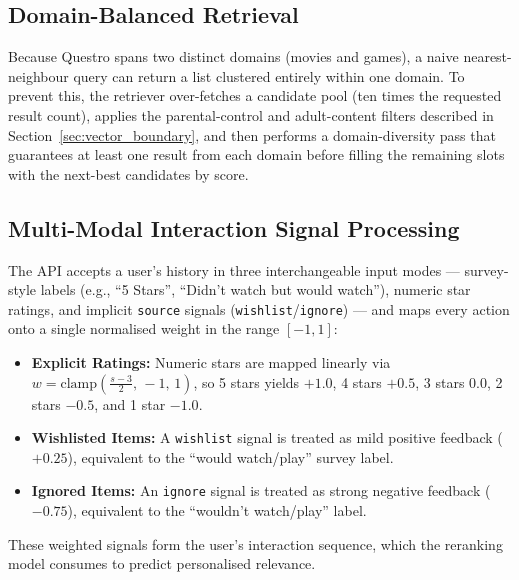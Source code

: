 \subsection{Domain-Balanced Retrieval}
Because Questro spans two distinct domains (movies and games), a naive nearest-neighbour query can return a list clustered entirely within one domain. To prevent this, the retriever over-fetches a candidate pool (ten times the requested result count), applies the parental-control and adult-content filters described in Section~\ref{sec:vector_boundary}, and then performs a domain-diversity pass that guarantees at least one result from each domain before filling the remaining slots with the next-best candidates by score.

\subsection{Multi-Modal Interaction Signal Processing}
The API accepts a user's history in three interchangeable input modes --- survey-style labels (e.g., ``5 Stars'', ``Didn't watch but would watch''), numeric star ratings, and implicit \texttt{source} signals (\texttt{wishlist}/\texttt{ignore}) --- and maps every action onto a single normalised weight in the range $[-1, 1]$:
\begin{itemize}
    \item \textbf{Explicit Ratings:} Numeric stars are mapped linearly via $w = \mathrm{clamp}\!\left(\tfrac{s-3}{2},\, -1,\, 1\right)$, so 5 stars yields $+1.0$, 4 stars $+0.5$, 3 stars $0.0$, 2 stars $-0.5$, and 1 star $-1.0$.
    \item \textbf{Wishlisted Items:} A \texttt{wishlist} signal is treated as mild positive feedback ($+0.25$), equivalent to the ``would watch/play'' survey label.
    \item \textbf{Ignored Items:} An \texttt{ignore} signal is treated as strong negative feedback ($-0.75$), equivalent to the ``wouldn't watch/play'' label.
\end{itemize}
These weighted signals form the user's interaction sequence, which the reranking model consumes to predict personalised relevance.


